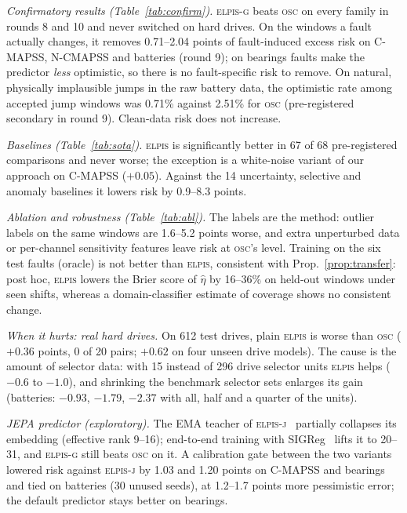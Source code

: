 \documentclass{esannV2}
\newcommand{\OSC}{\textsc{osc}}
\newcommand{\RPT}{\textsc{elpis}}
\newcommand{\AUTOD}{\textsc{elpis-g}}
\newcommand{\EJ}{\textsc{elpis-j}}
\begin{document}
\emph{Confirmatory results (Table~\ref{tab:confirm}).} \AUTOD{} beats \OSC{} on every family in rounds 8 and 10 and never switched on hard drives. On the windows a fault actually changes, it removes 0.71--2.04 points of fault-induced excess risk on C-MAPSS, N-CMAPSS and batteries (round 9); on bearings faults make the predictor \emph{less} optimistic, so there is no fault-specific risk to remove. On natural, physically implausible jumps in the raw battery data, the optimistic rate among accepted jump windows was 0.71\% against 2.51\% for \OSC{} (pre-registered secondary in round 9). Clean-data risk does not increase.



\emph{Baselines (Table~\ref{tab:sota}).} \RPT{} is significantly better in 67 of 68 pre-registered comparisons and never worse; the exception is a white-noise variant of our approach on C-MAPSS ($+0.05$). Against the 14 uncertainty, selective and anomaly baselines it lowers risk by 0.9--8.3 points.



\emph{Ablation and robustness (Table~\ref{tab:abl}).} The labels are the method: outlier labels on the same windows are 1.6--5.2 points worse, and extra unperturbed data or per-channel sensitivity features leave risk at \OSC's level. Training on the six test faults (oracle) is not better than \RPT, consistent with Prop.~\ref{prop:transfer}: post hoc, \RPT{} lowers the Brier score of $\hat\eta$ by 16--36\% on held-out windows under seen shifts, whereas a domain-classifier estimate of coverage shows no consistent change.

\emph{When it hurts: real hard drives.} On 612 test drives, plain \RPT{} is worse than \OSC{} ($+0.36$ points, 0 of 20 pairs; $+0.62$ on four unseen drive models). The cause is the amount of selector data: with 15 instead of 296 drive selector units \RPT{} helps ($-0.6$ to $-1.0$), and shrinking the benchmark selector sets enlarges its gain (batteries: $-0.93$, $-1.79$, $-2.37$ with all, half and a quarter of the units).

\emph{JEPA predictor (exploratory).} The EMA teacher of \EJ~\cite{assran2023ijepa} partially collapses its embedding (effective rank 9--16); end-to-end training with SIGReg~\cite{balestriero2025lejepa,maes2026leworldmodel} lifts it to 20--31, and \AUTOD{} still beats \OSC{} on it. A calibration gate between the two variants lowered risk against \EJ{} by 1.03 and 1.20 points on C-MAPSS and bearings and tied on batteries (30 unused seeds), at 1.2--1.7 points more pessimistic error; the default predictor stays better on bearings.
\end{document}
